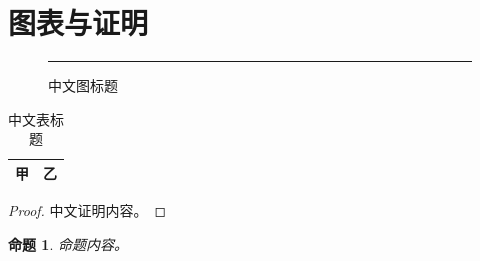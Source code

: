 \documentclass[a4paper,10pt]{article}
\newtheorem{proposition}{命题}
\begin{document}
\begin{abstract}
	中文摘要内容，用于测量摘要标题与正文。
\end{abstract}
\section{图表与证明}
\begin{figure}[h]
	\centering
	\rule{3cm}{1.5cm}
	\caption{中文图标题}
\end{figure}
\begin{table}[h]
	\centering
	\begin{tabular}{ll}\hline 甲 & 乙 \\\hline\end{tabular}
	\caption{中文表标题}
\end{table}
\begin{proof}
	中文证明内容。
\end{proof}
\begin{proposition}
	命题内容。
\end{proposition}
\end{document}
